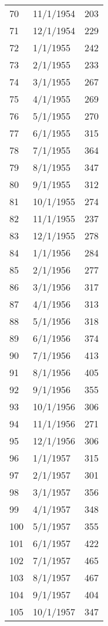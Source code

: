 \begin{tabular}{llr}
70  &  11/1/1954 &         203 \\
71  &  12/1/1954 &         229 \\
72  &   1/1/1955 &         242 \\
73  &   2/1/1955 &         233 \\
74  &   3/1/1955 &         267 \\
75  &   4/1/1955 &         269 \\
76  &   5/1/1955 &         270 \\
77  &   6/1/1955 &         315 \\
78  &   7/1/1955 &         364 \\
79  &   8/1/1955 &         347 \\
80  &   9/1/1955 &         312 \\
81  &  10/1/1955 &         274 \\
82  &  11/1/1955 &         237 \\
83  &  12/1/1955 &         278 \\
84  &   1/1/1956 &         284 \\
85  &   2/1/1956 &         277 \\
86  &   3/1/1956 &         317 \\
87  &   4/1/1956 &         313 \\
88  &   5/1/1956 &         318 \\
89  &   6/1/1956 &         374 \\
90  &   7/1/1956 &         413 \\
91  &   8/1/1956 &         405 \\
92  &   9/1/1956 &         355 \\
93  &  10/1/1956 &         306 \\
94  &  11/1/1956 &         271 \\
95  &  12/1/1956 &         306 \\
96  &   1/1/1957 &         315 \\
97  &   2/1/1957 &         301 \\
98  &   3/1/1957 &         356 \\
99  &   4/1/1957 &         348 \\
100 &   5/1/1957 &         355 \\
101 &   6/1/1957 &         422 \\
102 &   7/1/1957 &         465 \\
103 &   8/1/1957 &         467 \\
104 &   9/1/1957 &         404 \\
105 &  10/1/1957 &         347 \\

\end{tabular}
